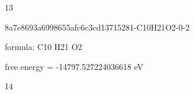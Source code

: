 \documentclass{article}
\begin{document}
13

\vspace{1cm}


8a7e8693a6998655afc6c3cd13715281-C10H21O2-0-2



formula: C10 H21 O2



free energy = -14797.527224036618 eV

14
\end{document}

